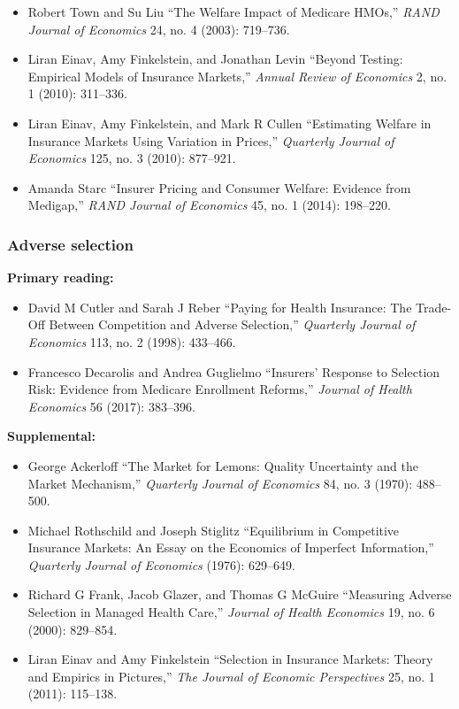 \documentclass[11pt,]{article}
\providecommand{\tightlist}{%
  \setlength{\itemsep}{0pt}\setlength{\parskip}{0pt}}
\begin{document}
\begin{itemize}
\tightlist
\item
  Robert Town and Su Liu {``The Welfare Impact of {Medicare} {HMOs},''}
  \emph{RAND Journal of Economics} 24, no. 4 (2003): 719--736.
\item
  Liran Einav, Amy Finkelstein, and Jonathan Levin {``Beyond {Testing}:
  {Empirical} {Models} of {Insurance} {Markets},''} \emph{Annual Review
  of Economics} 2, no. 1 (2010): 311--336.
\item
  Liran Einav, Amy Finkelstein, and Mark R Cullen {``Estimating
  {Welfare} in {Insurance} {Markets} {Using} {Variation} in {Prices},''}
  \emph{Quarterly Journal of Economics} 125, no. 3 (2010): 877--921.
\item
  Amanda Starc {``Insurer Pricing and Consumer Welfare: {Evidence} from
  Medigap,''} \emph{RAND Journal of Economics} 45, no. 1 (2014):
  198--220.
\end{itemize}

\hypertarget{adverse-selection}{%
\subsubsection{Adverse selection}\label{adverse-selection}}

\textbf{Primary reading:}

\begin{itemize}
\tightlist
\item
  David M Cutler and Sarah J Reber {``Paying for {Health} {Insurance}:
  {The} {Trade}-{Off} Between {Competition} and {Adverse}
  {Selection},''} \emph{Quarterly Journal of Economics} 113, no. 2
  (1998): 433--466.
\item
  Francesco Decarolis and Andrea Guglielmo {``Insurers' Response to
  Selection Risk: {Evidence} from {Medicare} Enrollment Reforms,''}
  \emph{Journal of Health Economics} 56 (2017): 383--396.
\end{itemize}

\textbf{Supplemental:}

\begin{itemize}
\tightlist
\item
  George Ackerloff {``The Market for Lemons: {Quality} Uncertainty and
  the Market Mechanism,''} \emph{Quarterly Journal of Economics} 84, no.
  3 (1970): 488--500.
\item
  Michael Rothschild and Joseph Stiglitz {``Equilibrium in Competitive
  Insurance Markets: {An} Essay on the Economics of Imperfect
  Information,''} \emph{Quarterly Journal of Economics} (1976):
  629--649.
\item
  Richard G Frank, Jacob Glazer, and Thomas G McGuire {``Measuring
  Adverse Selection in Managed Health Care,''} \emph{Journal of Health
  Economics} 19, no. 6 (2000): 829--854.
\item
  Liran Einav and Amy Finkelstein {``Selection in {Insurance} {Markets}:
  {Theory} and {Empirics} in {Pictures},''} \emph{The Journal of
  Economic Perspectives} 25, no. 1 (2011): 115--138.
\end{itemize}
\end{document}

